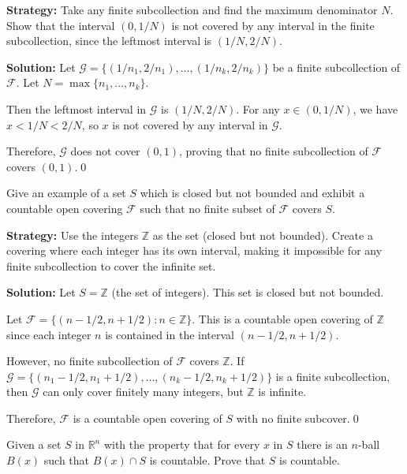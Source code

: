 \noindent\textbf{Strategy:} Take any finite subcollection and find the maximum denominator $N$. Show that the interval $(0, 1/N)$ is not covered by any interval in the finite subcollection, since the leftmost interval is $(1/N, 2/N)$.

\bigskip\noindent\textbf{Solution:} Let $\mathcal{G} = \{(1/n_1, 2/n_1), \ldots, (1/n_k, 2/n_k)\}$ be a finite subcollection of $\mathcal{F}$. Let $N = \max\{n_1, \ldots, n_k\}$.

Then the leftmost interval in $\mathcal{G}$ is $(1/N, 2/N)$. For any $x \in (0, 1/N)$, we have $x < 1/N < 2/N$, so $x$ is not covered by any interval in $\mathcal{G}$.

Therefore, $\mathcal{G}$ does not cover $(0,1)$, proving that no finite subcollection of $\mathcal{F}$ covers $(0,1)$.\qed


\begin{problembox}
Give an example of a set \( S \) which is closed but not bounded and exhibit a countable open covering \( \mathcal{F} \) such that no finite subset of \( \mathcal{F} \) covers \( S \).
\end{problembox}

\noindent\textbf{Strategy:} Use the integers $\mathbb{Z}$ as the set (closed but not bounded). Create a covering where each integer has its own interval, making it impossible for any finite subcollection to cover the infinite set.

\bigskip\noindent\textbf{Solution:} Let $S = \mathbb{Z}$ (the set of integers). This set is closed but not bounded.

Let $\mathcal{F} = \{(n-1/2, n+1/2) : n \in \mathbb{Z}\}$. This is a countable open covering of $\mathbb{Z}$ since each integer $n$ is contained in the interval $(n-1/2, n+1/2)$.

However, no finite subcollection of $\mathcal{F}$ covers $\mathbb{Z}$. If $\mathcal{G} = \{(n_1-1/2, n_1+1/2), \ldots, (n_k-1/2, n_k+1/2)\}$ is a finite subcollection, then $\mathcal{G}$ can only cover finitely many integers, but $\mathbb{Z}$ is infinite.

Therefore, $\mathcal{F}$ is a countable open covering of $S$ with no finite subcover.\qed


\begin{problembox}
Given a set \( S \) in \( \mathbb{R}^n \) with the property that for every \( x \) in \( S \) there is an \( n \)-ball \( B(x) \) such that \( B(x) \cap S \) is countable. Prove that \( S \) is countable.
\end{problembox}

